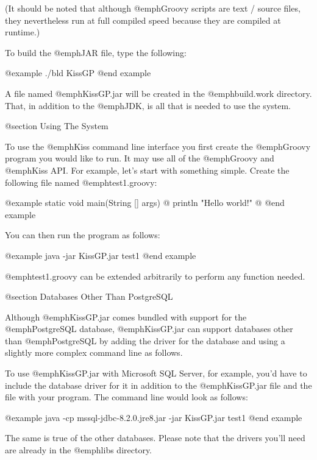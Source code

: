 (It should be noted that although @emph{Groovy} scripts are text /
source files, they nevertheless run at full compiled speed because
they are compiled at runtime.)

To build the @emph{JAR} file, type the following:

@example
./bld KissGP
@end example

A file named @emph{KissGP.jar} will be created in the @emph{build.work}
directory.  That, in addition to the @emph{JDK}, is all that is needed to
use the system.

@section Using The System

To use the @emph{Kiss} command line interface you first create the
@emph{Groovy} program you would like to run.  It may use all of the
@emph{Groovy} and @emph{Kiss} API.  For example, let's start with
something simple.  Create the following file named
@emph{test1.groovy}:

@example
static void main(String [] args) @{
    println "Hello world!"
@}
@end example

You can then run the program as follows:

@example
java -jar KissGP.jar test1
@end example

@emph{test1.groovy} can be extended arbitrarily to perform any function needed.

@section Databases Other Than PostgreSQL

Although @emph{KissGP.jar} comes bundled with support for the
@emph{PostgreSQL} database, @emph{KissGP.jar} can support databases
other than @emph{PostgreSQL} by adding the driver for the database and
using a slightly more complex command line as follows.

To use @emph{KissGP.jar} with Microsoft SQL Server, for example, you'd
have to include the database driver for it in addition to the
@emph{KissGP.jar} file and the file with your program.  The command
line would look as follows:

@example
java -cp mssql-jdbc-8.2.0.jre8.jar -jar KissGP.jar test1
@end example

The same is true of the other databases.  Please note that the drivers
you'll need are already in the @emph{libs} directory.


